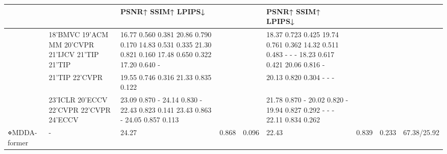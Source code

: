 \begin{tabular}{lllllllll}
\toprule
 &  & PSNR↑ SSIM↑ LPIPS↓ &  &  & PSNR↑ SSIM↑ LPIPS↓ &  &  &  \\
\midrule
 & 18’BMVC 19’ACM MM 20’CVPR 21’IJCV 21’TIP 21’TIP & 16.77 0.560 0.381 20.86 0.790 0.170 14.83 0.531 0.335 21.30 0.821 0.160 17.48 0.650 0.322 17.20 0.640 - &  &  & 18.37 0.723 0.425 19.74 0.761 0.362 14.32 0.511 0.483 - - - 18.23 0.617 0.421 20.06 0.816 - &  &  &  \\
 & 21’TIP 22’CVPR & 19.55 0.746 0.316 21.33 0.835 0.122 &  &  & 20.13 0.820 0.304 - - - &  &  &  \\
 & 23’ICLR 20’ECCV 22’CVPR 22’CVPR 24’ECCV & 23.09 0.870 - 24.14 0.830 - 22.43 0.823 0.141 23.43 0.863 - 24.05 0.857 0.113 &  &  & 21.78 0.870 - 20.02 0.820 - 19.94 0.827 0.292 - - - 22.11 0.834 0.262 &  &  &  \\
⋄MDDA-former & - & 24.27 & 0.868 & 0.096 & 22.43 & 0.839 & 0.233 & 67.38/25.92 \\
\bottomrule
\end{tabular}
